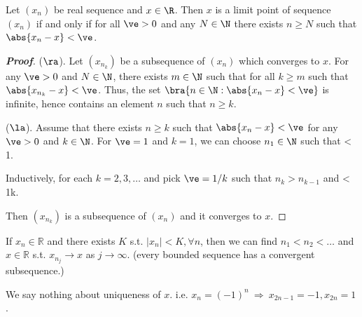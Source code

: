 \begin{lemma}\label{lem:limit_point_of_real_sequence_iff}
Let $(x_n)$ be real sequence and $x\in \R$. Then $x$ is a limit point of sequence $(x_n)$ if and only if for all $\ve>0$ and any $N\in\N$ there exists $n\geq N$ such that $\abs{x_n -x} < \ve$.
\end{lemma}

\begin{proof}[\bf Proof]
($\ra$). Let $(x_{n_k})$ be a subsequence of $(x_n)$ which converges to $x$. For any $\ve>0$ and $N\in \N$, there exists $m\in \N$ such that for all $k\geq m$ such that $\abs{x_{n_k} - x} < \ve$. Thus, the set $\bra{n\in \N: \abs{x_n -x}<\ve}$ is infinite, hence contains an element $n$ such that $n\geq k$.

($\la$). Assume that there exists $n\geq k$ such that $\abs{x_n - x}<\ve$ for any $\ve>0$ and $k\in \N$. For $\ve = 1$ and $k=1$, we can choose $n_1\in \N$ such that
\be
{} < 1.
\ee

Inductively, for each $k=2,3,\dots$ and pick $\ve = 1/k$ such that $n_k > n_{k-1}$ and
\be
{} < \frac 1k.
\ee

Then $(x_{n_k})$ is a subsequence of $(x_n)$ and it converges to $x$.%
\end{proof}

\begin{theorem}\label{thm:bolzano_weierstrass_r}
If $x_n\in\mathbb{R}$ and there exists $K$ s.t. $|x_n|<K,\forall n$, then we can find $n_1<n_2<\dots$ and $x\in\mathbb{R}$ s.t. $x_{n_j}\to x$ as $j\to \infty$. (every bounded sequence has a convergent subsequence.)
\end{theorem}

\begin{remark}
We say nothing about uniqueness of $x$. i.e. $x_n=(-1)^n\ \Rightarrow \ x_{2n-1}=-1,x_{2n}=1$.
\end{remark}

